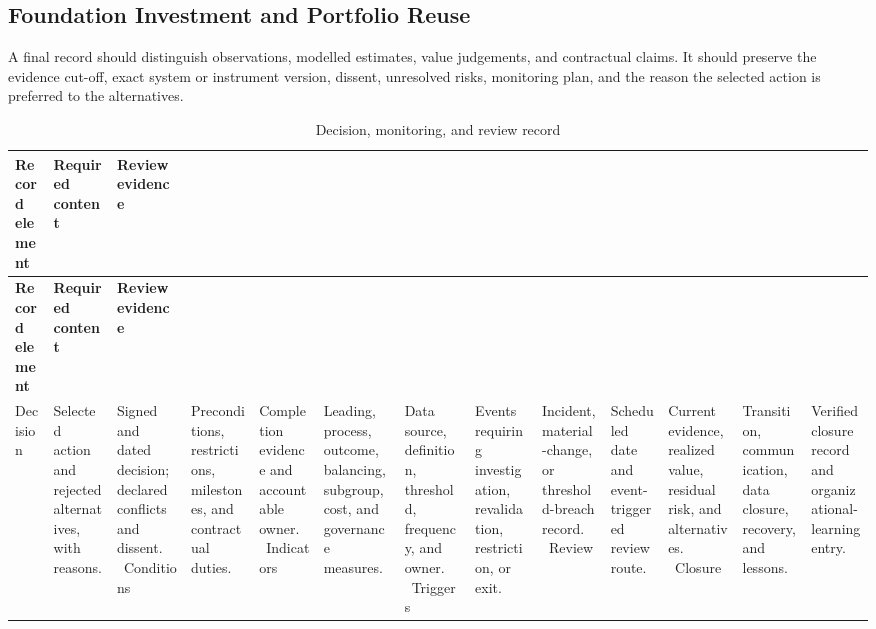 \subsection{Foundation Investment and Portfolio Reuse}
\label{sec:comp-ch02-supp-3}
A final record should distinguish observations, modelled estimates, value
judgements, and contractual claims. It should preserve the evidence cut-off, exact
system or instrument version, dissent, unresolved risks, monitoring plan, and the
reason the selected action is preferred to the alternatives.

\begin{longtable}{@{}p{}p{}p{}@{}}
\caption{Decision, monitoring, and review record}
\label{tab:comp-ch02-decision-record}\\
\toprule
\textbf{Record element} & \textbf{Required content} & \textbf{Review evidence} \\
\midrule
\endfirsthead
\toprule
\textbf{Record element} & \textbf{Required content} & \textbf{Review evidence} \\
\midrule
\endhead
\bottomrule
\endlastfoot
Decision & Selected action and rejected alternatives, with reasons. & Signed and dated decision; declared conflicts and dissent. \
Conditions & Preconditions, restrictions, milestones, and contractual duties. & Completion evidence and accountable owner. \
Indicators & Leading, process, outcome, balancing, subgroup, cost, and governance measures. & Data source, definition, threshold, frequency, and owner. \
Triggers & Events requiring investigation, revalidation, restriction, or exit. & Incident, material-change, or threshold-breach record. \
Review & Scheduled date and event-triggered review route. & Current evidence, realized value, residual risk, and alternatives. \
Closure & Transition, communication, data closure, recovery, and lessons. & Verified closure record and organizational-learning entry. \
\end{longtable}
